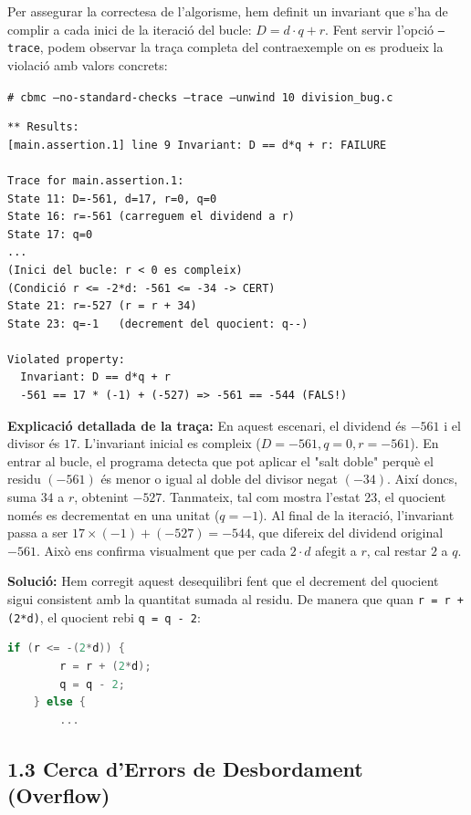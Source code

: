 \documentclass[12pt,a4paper]{article}
\begin{document}
Per assegurar la correctesa de l'algorisme, hem definit un invariant que s'ha de complir a cada inici de la iteració del bucle: $D = d \cdot q + r$. Fent servir l'opció \texttt{--trace}, podem observar la traça completa del contraexemple on es produeix la violació amb valors concrets:

\begin{tcolorbox}[colback=black!85, coltext=white]
\texttt{\# cbmc --no-standard-checks --trace --unwind 10 division\_bug.c}
\end{tcolorbox}

\begin{verbatim}
** Results:
[main.assertion.1] line 9 Invariant: D == d*q + r: FAILURE

Trace for main.assertion.1:
State 11: D=-561, d=17, r=0, q=0
State 16: r=-561 (carreguem el dividend a r)
State 17: q=0
...
(Inici del bucle: r < 0 es compleix)
(Condició r <= -2*d: -561 <= -34 -> CERT)
State 21: r=-527 (r = r + 34)
State 23: q=-1   (decrement del quocient: q--)

Violated property:
  Invariant: D == d*q + r
  -561 == 17 * (-1) + (-527) => -561 == -544 (FALS!)
\end{verbatim}

\textbf{Explicació detallada de la traça:} En aquest escenari, el dividend és $-561$ i el divisor és $17$. L'invariant inicial es compleix ($D=-561, q=0, r=-561$). En entrar al bucle, el programa detecta que pot aplicar el "salt doble" perquè el residu $(-561)$ és menor o igual al doble del divisor negat $(-34)$. Així doncs, suma $34$ a $r$, obtenint $-527$. Tanmateix, tal com mostra l'estat 23, el quocient només es decrementat en una unitat ($q=-1$). Al final de la iteració, l'invariant passa a ser $17 \times (-1) + (-527) = -544$, que difereix del dividend original $-561$. Això ens confirma visualment que per cada $2 \cdot d$ afegit a $r$, cal restar $2$ a $q$.

\textbf{Solució:} Hem corregit aquest desequilibri fent que el decrement del quocient sigui consistent amb la quantitat sumada al residu. De manera que quan \texttt{r = r + (2*d)}, el quocient rebi \texttt{q = q - 2}:

\begin{lstlisting}[language=C]
    if (r <= -(2*d)) { 
        r = r + (2*d); 
        q = q - 2;
    } else { 
        ...
\end{lstlisting}

\subsection{1.3 Cerca d'Errors de Desbordament (Overflow)}
\end{document}
